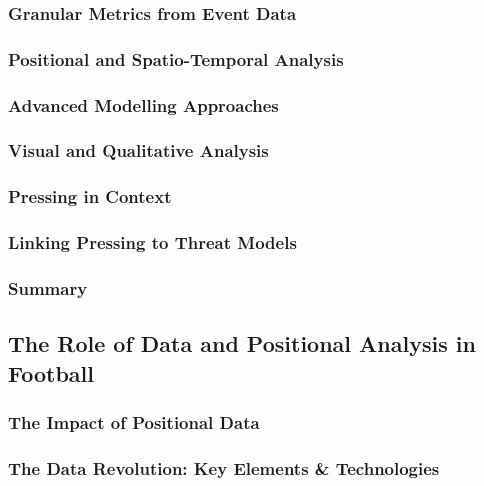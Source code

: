 \documentclass[12pt]{article}
\begin{document}
\subsubsection{Granular Metrics from Event Data}


\subsubsection{Positional and Spatio-Temporal Analysis}



\subsubsection{Advanced Modelling Approaches}



\subsubsection{Visual and Qualitative Analysis}




\subsubsection{Pressing in Context}




\subsubsection{Linking Pressing to Threat Models}




\subsubsection{Summary}


\subsection{The Role of Data and Positional Analysis in Football}

\subsubsection{The Impact of Positional Data}


\subsubsection{The Data Revolution: Key Elements & Technologies}
\end{document}
